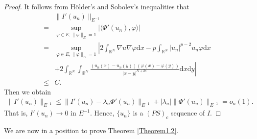 \documentclass[12pt,a4paper,reqno]{amsart}
\numberwithin{equation}{section}
\begin{document}
\begin{proof}
It follows from H\"{o}lder's and Sobolev's inequalities that
\begin{equation*}
\begin{aligned}
&\|I'(u_{n})\|_{E^{-1}}\\
=&\sup_{\varphi\in E,\|\varphi\|_{E}=1}
|\langle \Phi'(u_{n}),\varphi\rangle|\\
=&\sup_{\varphi\in E,\|\varphi\|_{E}=1}
\left|
2\int_{\mathbb{R}^{N}}
\nabla u \nabla \varphi
\mathrm{d}x
-p
\int_{\mathbb{R}^{N}}
|u_{n}|^{p-2}u_{n}\varphi
\mathrm{d}x
\right.\\
&\left.+2
\int_{\mathbb{R}^{N}}
\int_{\mathbb{R}^{N}}
\frac{(u_{n}(x)-u_{n}(y))(\varphi(x)-\varphi(y))}{|x-y|^{N+2s}}
\mathrm{d}x
\mathrm{d}y
\right|\\
\leqslant&C.
\end{aligned}
\end{equation*}
Then we obtain
\begin{equation*}
\begin{aligned}
\|I'(u_{n})\|_{E^{-1}}
\leqslant\|I'(u_{n})-\lambda_{n}\Phi'(u_{n})\|_{E^{-1}}
+|\lambda_{n}|\|\Phi'(u_{n})\|_{E^{-1}}
=o_{n}(1).
\end{aligned}
\end{equation*}
That is, $I'(u_{n})\rightarrow0$ in $E^{-1}$.
Hence, $\{u_{n}\}$ is a $(PS)_{{c}}$ sequence of $I$.
\end{proof}
We are now in a position to prove Theorem \ref{Theorem1.2}.
\end{document}
